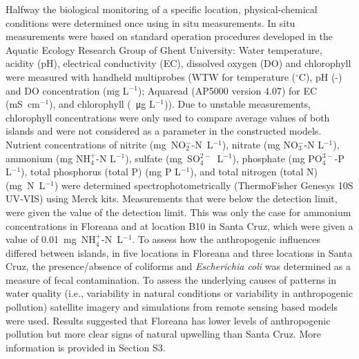 \documentclass[jmse,article,accept,moreauthors,pdftex]{Definitions/mdpi}
\begin{document}
Halfway the biological monitoring of a specific location, physical-chemical conditions were determined once using in situ measurements. In situ measurements were based on standard operation procedures developed in the Aquatic Ecology Research Group of Ghent University: Water temperature, acidity (pH), electrical conductivity (EC), dissolved oxygen (DO) and chlorophyll were measured with handheld multiprobes (WTW for temperature ($^{\circ}$C), pH (-) and DO concentration (mg L$^{-1}$); Aquaread (AP5000 version 4.07) for EC \mbox{(mS cm$^{-1}$)}, and chlorophyll (\SI{}{\micro\gram} L$^{-1}$)). Due to unstable measurements, chlorophyll concentrations were only used to compare average values of both islands and were not considered as a parameter in the constructed models. Nutrient concentrations of nitrite \mbox{(mg NO$_{2}^{-}$-N L$^{-1}$),} nitrate (mg NO$_{3}^{-}$-N L$^{-1}$), ammonium (mg NH$_{4}^{+}$-N L$^{-1}$), sulfate (\mbox{mg SO$_{4}^{2-}$ L$^{-1}$}), phosphate (mg PO$_{4}^{3-}$-P L$^{-1}$), total phosphorus (total P) (mg P L$^{-1}$), and total nitrogen (total N) (\mbox{mg N L$^{-1}$}) were determined spectrophotometrically (ThermoFisher %
Genesys 10S UV‐VIS) using Merck kits. Measurements that were below the detection limit, were given the value of the detection limit. This was only the case for ammonium concentrations in Floreana and at location B10 in Santa Cruz, which were given a value of \mbox{0.01 mg NH$_{4}^{+}$-N L$^{-1}$.} To assess how the anthropogenic influences differed between islands, in five locations in Floreana and three locations in Santa Cruz, the presence/absence of coliforms and \textit{Escherichia coli} was determined as a measure of fecal contamination. To assess the underlying causes of patterns in water quality (i.e., variability in natural conditions or variability in anthropogenic pollution) satellite imagery and simulations from remote sensing based models were used. Results suggested that Floreana has lower levels of anthropogenic pollution but more clear signs of natural upwelling than Santa Cruz. More information is provided in {Section S3.}%
\end{document}
